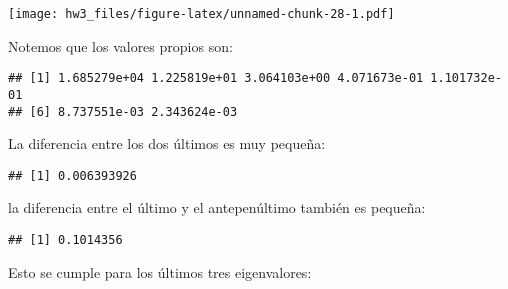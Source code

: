 \documentclass[]{article}
\newenvironment{Shaded}{\begin{snugshade}}{\end{snugshade}}
\newcommand{\DecValTok}[1]{\textcolor[rgb]{0.00,0.00,0.81}{#1}}
\newcommand{\NormalTok}[1]{#1}
\newcommand{\OperatorTok}[1]{\textcolor[rgb]{0.81,0.36,0.00}{\textbf{#1}}}
\begin{document}
\texttt{[image: hw3\_files/figure-latex/unnamed-chunk-28-1.pdf]}

Notemos que los valores propios son:

\begin{Shaded}
\end{Shaded}

\begin{verbatim}
## [1] 1.685279e+04 1.225819e+01 3.064103e+00 4.071673e-01 1.101732e-01
## [6] 8.737551e-03 2.343624e-03
\end{verbatim}

La diferencia entre los dos últimos es muy pequeña:

\begin{Shaded}
\end{Shaded}

\begin{verbatim}
## [1] 0.006393926
\end{verbatim}

la diferencia entre el último y el antepenúltimo también es pequeña:

\begin{Shaded}
\end{Shaded}

\begin{verbatim}
## [1] 0.1014356
\end{verbatim}

Esto se cumple para los últimos tres eigenvalores:

\begin{Shaded}
\end{Shaded}
\end{document}
